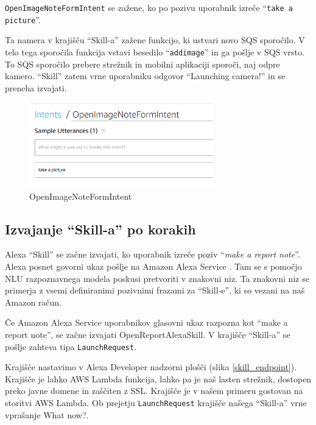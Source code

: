 \documentclass[a4paper, 12pt]{book}
\begin{document}
\texttt{OpenImageNoteFormIntent} se zažene, ko po pozivu uporabnik izreče \enquote{\texttt{take a picture}}.

Ta namera v krajišču \enquote{Skill-a} zažene funkcijo, ki ustvari novo SQS sporočilo.
V telo tega sporočila funkcija vstavi besedilo \enquote{\texttt{addimage}} in ga pošlje v SQS vrsto.
To SQS sporočilo prebere strežnik in mobilni aplikaciji sporoči, naj odpre kamero.
\enquote{Skill} zatem vrne uporabniku odgovor \enquote{Launching camera!} in se preneha izvajati.

\begin{figure}[H]
\begin{center}
\includegraphics[width=8cm]{intent_image}
\end{center}
\caption{OpenImageNoteFormIntent}
\label{OpenImageNoteFormIntent}
\end{figure}

\subsection{Izvajanje \enquote{Skill-a} po korakih}

Alexa \enquote{Skill} se začne izvajati, ko uporabnik izreče poziv \enquote{\textit{make a report note}}.
Alexa posnet govorni ukaz pošlje na Amazon Alexa Service \cite{skillexecution}.
Tam se s pomočjo NLU razpoznavnega modela poskusi pretvoriti v znakovni niz.
Ta znakovni niz se primerja z vsemi definiranimi pozivnimi frazami za \enquote{Skill-e}, ki so vezani na naš Amazon račun.

Če Amazon Alexa Service uporabnikov glasovni ukaz razpozna kot \enquote{make a report note}, se začne izvajati OpenReportAlexaSkill.
V krajišče \enquote{Skill-a} se pošlje zahteva tipa \texttt{LaunchRequest}.

Krajišče nastavimo v Alexa Developer nadzorni plošči (slika \ref{skill_endpoint}).
Krajišče je lahko AWS Lambda funkcija, lahko pa je naš lasten strežnik, dostopen preko javne domene in zaščiten z SSL.
Krajišče je v našem primeru gostovan na storitvi AWS Lambda.
Ob prejetju \texttt{LaunchRequest} krajišče našega \enquote{Skill-a} vrne vprašanje What now?.
\end{document}

